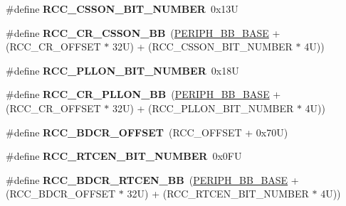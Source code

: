 \begin{DoxyCompactItemize}
\#define {\bfseries R\+C\+C\+\_\+\+C\+S\+S\+O\+N\+\_\+\+B\+I\+T\+\_\+\+N\+U\+M\+B\+ER}~0x13U
\item 
\mbox{\label{group___r_c_c___bit_address___alias_region_ga37c353c62ad303e661e99f20dcc6d1f0}} 
\#define {\bfseries R\+C\+C\+\_\+\+C\+R\+\_\+\+C\+S\+S\+O\+N\+\_\+\+BB}~(\hyperlink{group___peripheral__memory__map_gaed7efc100877000845c236ccdc9e144a}{P\+E\+R\+I\+P\+H\+\_\+\+B\+B\+\_\+\+B\+A\+SE} + (R\+C\+C\+\_\+\+C\+R\+\_\+\+O\+F\+F\+S\+ET $\ast$ 32\+U) + (\+R\+C\+C\+\_\+\+C\+S\+S\+O\+N\+\_\+\+B\+I\+T\+\_\+\+N\+U\+M\+B\+E\+R $\ast$ 4\+U))
\item 
\mbox{\label{group___r_c_c___bit_address___alias_region_gaed4c77e51cc821b9645cb7874bf5861b}} 
\#define {\bfseries R\+C\+C\+\_\+\+P\+L\+L\+O\+N\+\_\+\+B\+I\+T\+\_\+\+N\+U\+M\+B\+ER}~0x18U
\item 
\mbox{\label{group___r_c_c___bit_address___alias_region_ga0b0a8f171b66cc0d767716ba23ad3c6f}} 
\#define {\bfseries R\+C\+C\+\_\+\+C\+R\+\_\+\+P\+L\+L\+O\+N\+\_\+\+BB}~(\hyperlink{group___peripheral__memory__map_gaed7efc100877000845c236ccdc9e144a}{P\+E\+R\+I\+P\+H\+\_\+\+B\+B\+\_\+\+B\+A\+SE} + (R\+C\+C\+\_\+\+C\+R\+\_\+\+O\+F\+F\+S\+ET $\ast$ 32\+U) + (\+R\+C\+C\+\_\+\+P\+L\+L\+O\+N\+\_\+\+B\+I\+T\+\_\+\+N\+U\+M\+B\+E\+R $\ast$ 4\+U))
\item 
\mbox{\label{group___r_c_c___bit_address___alias_region_gaf234fe5d9628a3f0769721e76f83c566}} 
\#define {\bfseries R\+C\+C\+\_\+\+B\+D\+C\+R\+\_\+\+O\+F\+F\+S\+ET}~(R\+C\+C\+\_\+\+O\+F\+F\+S\+ET + 0x70\+U)
\item 
\mbox{\label{group___r_c_c___bit_address___alias_region_gac4074d20c157f0892c6effb8bf22c8d7}} 
\#define {\bfseries R\+C\+C\+\_\+\+R\+T\+C\+E\+N\+\_\+\+B\+I\+T\+\_\+\+N\+U\+M\+B\+ER}~0x0\+FU
\item 
\mbox{\label{group___r_c_c___bit_address___alias_region_ga583ba8653153b48a06473d0a331f781d}} 
\#define {\bfseries R\+C\+C\+\_\+\+B\+D\+C\+R\+\_\+\+R\+T\+C\+E\+N\+\_\+\+BB}~(\hyperlink{group___peripheral__memory__map_gaed7efc100877000845c236ccdc9e144a}{P\+E\+R\+I\+P\+H\+\_\+\+B\+B\+\_\+\+B\+A\+SE} + (R\+C\+C\+\_\+\+B\+D\+C\+R\+\_\+\+O\+F\+F\+S\+ET $\ast$ 32\+U) + (\+R\+C\+C\+\_\+\+R\+T\+C\+E\+N\+\_\+\+B\+I\+T\+\_\+\+N\+U\+M\+B\+E\+R $\ast$ 4\+U))

\end{DoxyCompactItemize}
